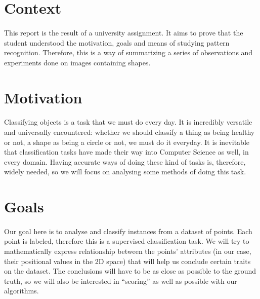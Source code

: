 \section{Context}
\paragraph{}
This report is the result of a university assignment.
It aims to prove that the student understood the motivation, goals and means of studying pattern recognition.
Therefore, this is a way of summarizing a series of observations and experiments done on images containing shapes.

\section{Motivation}
\paragraph{}
Classifying objects is a task that we must do every day. It is incredibly versatile and universally encountered: whether we should classify a thing as being healthy or not, a shape as being a circle or not, we must do it everyday.
It is inevitable that classification tasks have made their way into Computer Science as well, in every domain.
Having accurate ways of doing these kind of tasks is, therefore, widely needed, so we will focus on analysing some methods of doing this task.

\section{Goals}
\paragraph{}
Our goal here is to analyse and classify instances from a dataset of points.
Each point is labeled, therefore this is a supervised classification task.
We will try to mathematically express relationship between the points' attributes (in our case, their positional values in the 2D space) that will help us conclude certain traits on the dataset.
The conclusions will have to be as close as possible to the ground truth, so we will also be interested in ``scoring'' as well as possible with our algorithms.